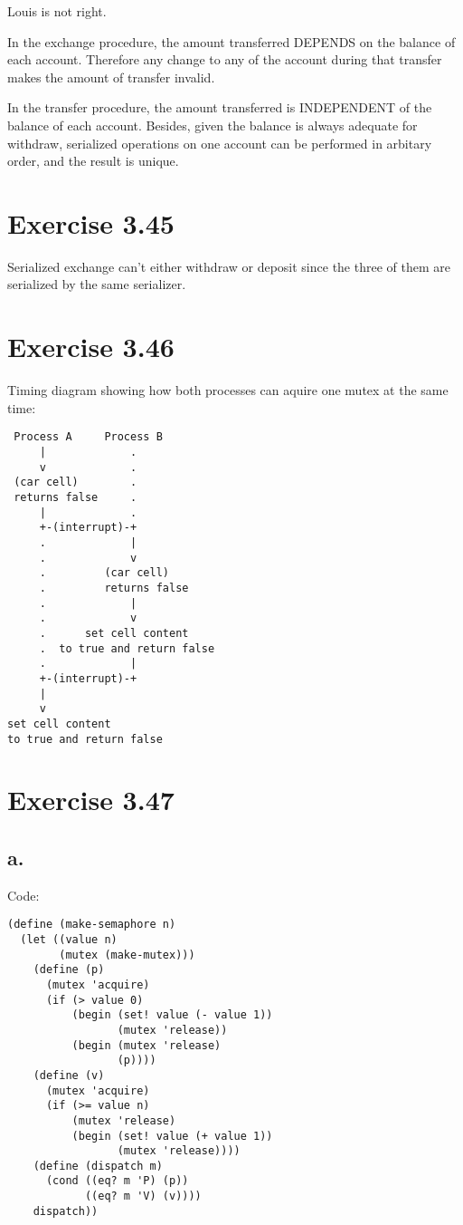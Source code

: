 \documentclass[../main.tex]{subfiles}
\begin{document}
Louis is not right.

In the exchange procedure, the amount transferred DEPENDS on the balance of each account. Therefore any change to any of the account during that transfer makes the amount of transfer invalid.

In the transfer procedure, the amount transferred is INDEPENDENT of the balance of each account. Besides, given the balance is always adequate for withdraw, serialized operations on one account can be performed in arbitary order, and the result is unique.

\section{Exercise 3.45}

Serialized exchange can't either withdraw or deposit since the three of them are serialized by the same serializer.

\section{Exercise 3.46}

Timing diagram showing how both processes can aquire one mutex at the same time:

\begin{lstlisting}
 Process A     Process B
     |             .
     v             .
 (car cell)        .
 returns false     .
     |             .
     +-(interrupt)-+
     .             |
     .             v
     .         (car cell)
     .         returns false
     .             |
     .             v
     .      set cell content
     .  to true and return false
     .             |
     +-(interrupt)-+
     |
     v
set cell content
to true and return false
\end{lstlisting}

\section{Exercise 3.47}

\subsection{a.}

Code:

\begin{lstlisting}
(define (make-semaphore n)
  (let ((value n)
        (mutex (make-mutex)))
    (define (p)
      (mutex 'acquire)
      (if (> value 0)
          (begin (set! value (- value 1))
                 (mutex 'release))
          (begin (mutex 'release)
                 (p))))
    (define (v)
      (mutex 'acquire)
      (if (>= value n)
          (mutex 'release)
          (begin (set! value (+ value 1))
                 (mutex 'release))))
    (define (dispatch m)
      (cond ((eq? m 'P) (p))
            ((eq? m 'V) (v))))
    dispatch))
\end{lstlisting}
\end{document}
